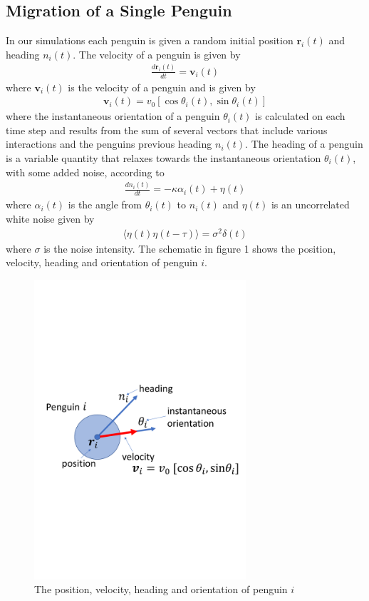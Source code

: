 \documentclass[]{scrartcl}
\begin{document}
\subsection{Migration of a Single Penguin}
In our simulations each penguin is given a random initial position $\textbf{r}_i(t)$ and heading $n_i(t)$. The velocity of a penguin is given by
\begin{align}
\frac{d\textbf{r}_i(t)}{dt} = \textbf{v}_i (t)
\end{align}
where $\textbf{v}_i(t)$ is the velocity of a penguin and is given by 
\begin{align}
\textbf{v}_i(t) = v_0 [\cos\theta_i(t), \sin \theta_i(t)]
\end{align}
where the instantaneous orientation of a penguin $\theta_i(t)$ is calculated on each time step and results from the sum of several vectors that include various interactions and the penguins previous heading $n_i(t)$. The heading of a penguin is a variable quantity that relaxes towards the instantaneous orientation $\theta_i(t)$, with some added noise, according to 
\begin{align}
\frac{dn_i(t)}{dt} = - \kappa  \alpha_i(t) + \eta (t)
\end{align}
where $\alpha_i(t)$ is the angle from $\theta_i(t)$ to $n_i(t)$ and $\eta (t) $ is an uncorrelated white noise given by 
\begin{align}
\langle \eta(t) \eta(t- \tau) \rangle = \sigma^2 \delta (t) 
\end{align}
where $\sigma$ is the noise intensity. The schematic in figure 1 shows the position, velocity, heading and orientation of penguin $i$.
\begin{figure}[H]
\centering
\includegraphics[width = 0.7\textwidth]{figs/fig1.pdf}
\caption{The position, velocity, heading and orientation of penguin $i$}
\end{figure}
\end{document}
